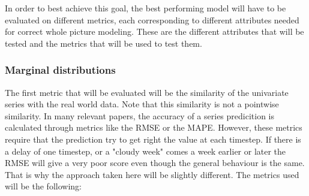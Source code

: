 In order to best achieve this goal, the best performing model will have to be evaluated on different metrics, each corresponding to different attributes needed for correct whole picture modeling. These are the different attributes that will be tested and the metrics that will be used to test them. 

\subsubsection{Marginal distributions}
The first metric that will be evaluated will be the similarity of the univariate series with the real world data. Note that this similarity is not a pointwise similarity. In many relevant papers, the accuracy of a series predicition is calculated through metrics like the RMSE or the MAPE. However, these metrics require that the prediction try to get right the value at each timestep. If there is a delay of one timestep, or a "cloudy week" comes a week earlier or later the RMSE will give a very poor score even though the general behaviour is the same. That is why the approach taken here will be slightly different. The metrics used will be the following:
